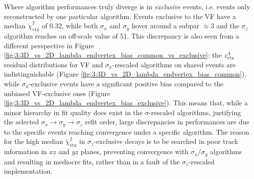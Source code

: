 Where algorithm performances truly diverge is in \textit{exclusive} events, i.e. events only reconstructed by one particular algorithm.
Events exclusive to the VF have a median $\tilde{\chi}^2_\text{vtx}$ of 0.32, while both $\sigma_x$ and $\sigma_y$ hover around a subpar $\approx 3$ and the $\sigma_z$ algorithm reaches an off-scale value of 51.
This discrepancy is also seen from a different perspective in Figure \ref{fig:3:3D_vs_2D_lambda_endvertex_bias_common_vs_exclusive}: the $z_\text{vtx}^\Lambda$ residual distributions for VF and $\sigma_x$-rescaled algorithms on shared events are indistinguishable (Figure \ref{fig:3:3D_vs_2D_lambda_endvertex_bias_common}), while $\sigma_x$-exclusive events have a significant positive bias compared to the unbiased VF-exclusive ones (Figure \ref{fig:3:3D_vs_2D_lambda_endvertex_bias_exclusive}).
This means that, while a minor hierarchy in fit quality does exist in the $\sigma$-rescaled algorithms, justifying the selected $\sigma_x \rightarrow \sigma_y \rightarrow \sigma_z$ refit order, large discrepancies in performances are due to the specific events reaching convergence under a specific algorithm.
The reason for the high median $\tilde{\chi}^2_\text{vtx}$ in $\sigma_z$-exclusive \lambdadecay decays is to be searched in poor track information in $xz$ and $yz$ planes, preventing convergence with $\sigma_x$/$\sigma_y$ algorithms and resulting in mediocre fits, rather than in a fault of the $\sigma_z$-rescaled implementation.

